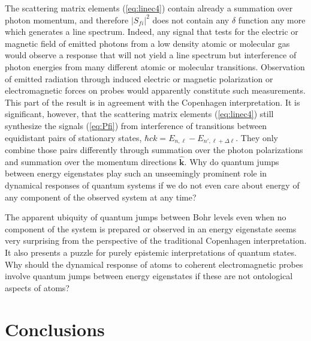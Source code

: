 \documentclass[final,3p,times,twocolumn]{elsarticle3}
\begin{document}
The scattering matrix elements (\ref{eq:linec4}) contain already a
summation over photon momentum, and therefore $|S_{\!fi}|^2$ does not 
contain any $\delta$ function any more which generates a line spectrum. 
Indeed,  any signal that tests for the electric or magnetic field
of emitted photons from a low density atomic or molecular gas would observe
a response that will not yield a line spectrum but interference of 
photon energies from many different atomic or molecular transitions.
Observation of emitted radiation through induced electric or magnetic
polarization or electromagnetic forces on probes
would apparently constitute such measurements.
This part of the result is in agreement with the Copenhagen interpretation.
It is significant, however, that the scattering matrix elements (\ref{eq:linec4}) 
still synthesize the signals (\ref{eq:Pfi}) from interference of transitions 
between equidistant pairs of stationary 
states, $\hbar ck=E_{n,\ell}-E_{n',\ell+\Delta\ell}$. They only combine those pairs 
differently through summation over the photon polarizations
and summation over the momentum directions $\hat{\bm{k}}$. 
Why do quantum jumps between energy eigenstates play such 
an unseemingly prominent role in dynamical responses of quantum systems if we
do not even care about energy of any component of the observed system
at any time?

The apparent ubiquity of quantum jumps between Bohr levels even when no
component of the system is prepared or observed in an energy eigenstate
seems very surprising from the perspective of the traditional Copenhagen 
interpretation. It also presents a puzzle for purely epistemic interpretations
of quantum states. Why should the dynamical response of atoms
to coherent electromagnetic probes involve quantum jumps between energy
eigenstates if these are not ontological aspects of atoms?


\section{Conclusions}
\label{sec:conc}
\end{document}
